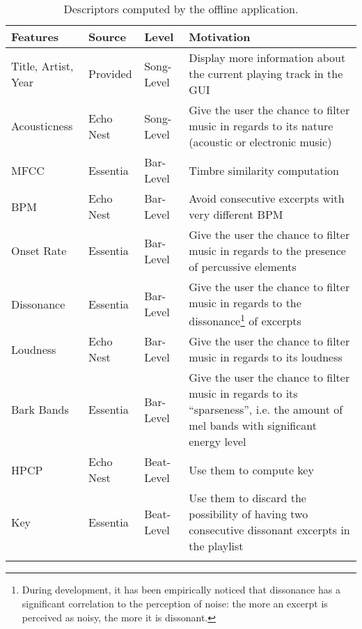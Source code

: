 \begin{center} 
\begin{longtable}{ p{}  p{}  p{}  p{} } 
\textbf{Features} & \textbf{Source} & \textbf{Level} & \textbf{Motivation} \\ \toprule
Title, Artist, Year & Provided & Song-Level & Display more information about the current playing track in the GUI \\ \midrule
Acousticness & Echo Nest & Song-Level & Give the user the chance to filter music in regards to its nature (acoustic or electronic music) \\ \midrule
MFCC & Essentia & Bar-Level & Timbre similarity computation \\ \midrule
BPM & Echo Nest & Bar-Level & Avoid consecutive excerpts with very different BPM \\ \midrule
Onset Rate & Essentia & Bar-Level & Give the user the chance to filter music in regards to the presence of percussive elements \\ \midrule
Dissonance & Essentia & Bar-Level & Give the user the chance to filter music in regards to the dissonance\footnote{During development, it has been empirically noticed that dissonance has a significant correlation to the perception of noise: the more an excerpt is perceived as noisy, the more it is dissonant.} of excerpts \\ \midrule
Loudness & Echo Nest & Bar-Level & Give the user the chance to filter music in regards to its loudness \\ \midrule
Bark Bands & Essentia & Bar-Level & Give the user the chance to filter music in regards to its ``sparseness'', i.e. the amount of mel bands with significant energy level \\ \midrule
HPCP & Echo Nest & Beat-Level & Use them to compute key \\ \midrule
Key & Essentia & Beat-Level & Use them to discard the possibility of having two consecutive dissonant excerpts in the playlist \\ \bottomrule
\caption[List of descriptors computed offline]{Descriptors computed by the offline application.}
\label{table:offlinedescriptors}
\end{longtable}
\end{center}



